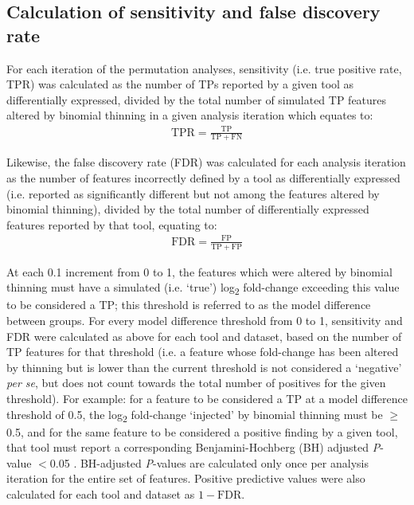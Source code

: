 \documentclass[10pt,letterpaper]{article}
\begin{document}
\subsection*{Calculation of sensitivity and false discovery rate}
For each iteration of the permutation analyses, sensitivity (i.e. true positive rate, TPR) was calculated as the number of TPs reported by a given tool as differentially expressed, divided by the total number of simulated TP features altered by binomial thinning in a given analysis iteration which equates to:
\begin{eqnarray}
	\label{eq:TPR}
	\mathrm{TPR} = \frac{\mathrm{TP}}{\mathrm{TP} + \mathrm{FN}}
 \end{eqnarray}
 
Likewise, the false discovery rate (FDR) was calculated for each analysis iteration as the number of features incorrectly defined by a tool as differentially expressed (i.e. reported as significantly different but not among the features altered by binomial thinning), divided by the total number of differentially expressed features reported by that tool, equating to: 
\begin{eqnarray}
	\label{eq:FDR}
	\mathrm{FDR} = \frac{\mathrm{FP}}{\mathrm{TP} + \mathrm{FP}}
 \end{eqnarray}
 
At each 0.1 increment from 0 to 1, the features which were altered by binomial thinning must have a simulated (i.e. `true') log\textsubscript{2} fold-change exceeding this value to be considered a TP; this threshold is referred to as the model difference between groups. For every model difference threshold from 0 to 1, sensitivity and FDR were calculated as above for each tool and dataset, based on the number of TP features for that threshold (i.e. a feature whose fold-change has been altered by thinning but is lower than the current threshold is not considered a `negative' \textit{per se}, but does not count towards the total number of positives for the given threshold). For example: for a feature to be considered a TP at a model difference threshold of 0.5, the log\textsubscript{2} fold-change `injected' by binomial thinning must be $\geq$0.5, and for the same feature to be considered a positive finding by a given tool, that tool must report a corresponding Benjamini-Hochberg (BH) adjusted \textit{P}-value $<$0.05 \cite{benjamini:1995}. BH-adjusted \textit{P}-values are calculated only once per analysis iteration for the entire set of features. Positive predictive values were also calculated for each tool and dataset as $1 - \mathrm{FDR}$.
\end{document}
